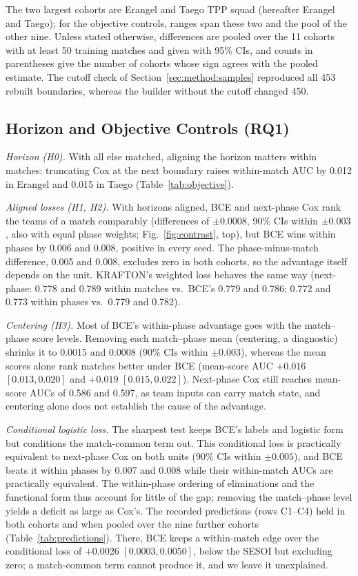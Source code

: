 \documentclass[sigconf,anonymous]{acmart}
\begin{document}
The two largest cohorts are Erangel and Taego TPP squad (hereafter Erangel and Taego); for the objective controls, ranges span these two and the pool of the other nine. Unless stated otherwise, differences are pooled over the 11 cohorts with at least 50 training matches and given with 95\% CIs, and counts in parentheses give the number of cohorts whose sign agrees with the pooled estimate. The cutoff check of Section~\ref{sec:method:samples} reproduced all 453 rebuilt boundaries, whereas the builder without the cutoff changed 450.

\subsection{Horizon and Objective Controls (RQ1)}
\label{sec:results:rq1}
\emph{Horizon (H0).} With all else matched, aligning the horizon matters within matches: truncating Cox at the next boundary raises within-match AUC by 0.012 in Erangel and 0.015 in Taego (Table~\ref{tab:objective}).

\emph{Aligned losses (H1, H2).} With horizons aligned, BCE and next-phase Cox rank the teams of a match comparably (differences of $\pm0.0008$, 90\% CIs within $\pm0.003$, also with equal phase weights; Fig.~\ref{fig:contrast}, top), but BCE wins within phases by 0.006 and 0.008, positive in every seed. The phase-minus-match difference, 0.005 and 0.008, excludes zero in both cohorts, so the advantage itself depends on the unit. KRAFTON's weighted loss behaves the same way (next-phase: 0.778 and 0.789 within matches vs.\ BCE's 0.779 and 0.786; 0.772 and 0.773 within phases vs.\ 0.779 and 0.782).

\emph{Centering (H3).} Most of BCE's within-phase advantage goes with the match--phase score levels. Removing each match--phase mean (centering, a diagnostic) shrinks it to 0.0015 and 0.0008 (90\% CIs within $\pm0.003$), whereas the mean scores alone rank matches better under BCE (mean-score AUC $+0.016$ $[0.013,\allowbreak 0.020]$ and $+0.019$ $[0.015,\allowbreak 0.022]$). Next-phase Cox still reaches mean-score AUCs of 0.586 and 0.597, as team inputs can carry match state, and centering alone does not establish the cause of the advantage.

\emph{Conditional logistic loss.} The sharpest test keeps BCE's labels and logistic form but conditions the match-common term out. This conditional loss is practically equivalent to next-phase Cox on both units (90\% CIs within $\pm0.005$), and BCE beats it within phases by 0.007 and 0.008 while their within-match AUCs are practically equivalent. The within-phase ordering of eliminations and the functional form thus account for little of the gap; removing the match--phase level yields a deficit as large as Cox's. The recorded predictions (rows C1--C4) held in both cohorts and when pooled over the nine further cohorts (Table~\ref{tab:predictions}). There, BCE keeps a within-match edge over the conditional loss of $+0.0026$ $[0.0003,\allowbreak 0.0050]$, below the SESOI but excluding zero; a match-common term cannot produce it, and we leave it unexplained.
\end{document}
